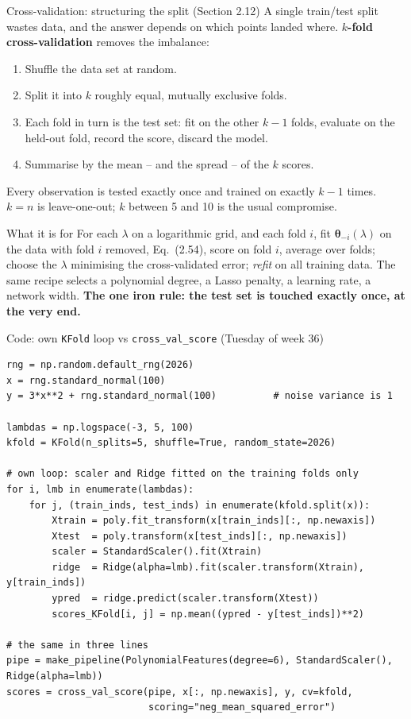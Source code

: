 \documentclass[10pt,aspectratio=169]{beamer}
\begin{document}
\begin{frame}{Cross-validation: structuring the split (Section 2.12)}
A single train/test split wastes data, and the answer depends on which points
landed where.  \textbf{$k$-fold cross-validation} removes the imbalance:
\begin{enumerate}
  \item Shuffle the data set at random.
  \item Split it into $k$ roughly equal, mutually exclusive folds.
  \item Each fold in turn is the test set: fit on the other $k-1$ folds,
        evaluate on the held-out fold, record the score, discard the model.
  \item Summarise by the mean -- and the spread -- of the $k$ scores.
\end{enumerate}
Every observation is tested exactly once and trained on exactly $k-1$ times.
$k=n$ is leave-one-out; $k$ between 5 and 10 is the usual compromise.
\vspace{4pt}
\begin{block}{What it is for}
For each $\lambda$ on a logarithmic grid, and each fold $i$, fit
$\bm{\theta}_{-i}(\lambda)$ on the data with fold $i$ removed, Eq.~(2.54),
score on fold $i$, average over folds; choose the $\lambda$ minimising the
cross-validated error; \emph{refit} on all training data.  The same recipe
selects a polynomial degree, a Lasso penalty, a learning rate, a network
width.  \textbf{The one iron rule: the test set is touched exactly once, at
the very end.}
\end{block}
\end{frame}

\begin{frame}[fragile]{Code: own \texttt{KFold} loop vs \texttt{cross\_val\_score} (Tuesday of week 36)}
\begin{lstlisting}
rng = np.random.default_rng(2026)
x = rng.standard_normal(100)
y = 3*x**2 + rng.standard_normal(100)          # noise variance is 1

lambdas = np.logspace(-3, 5, 100)
kfold = KFold(n_splits=5, shuffle=True, random_state=2026)

# own loop: scaler and Ridge fitted on the training folds only
for i, lmb in enumerate(lambdas):
    for j, (train_inds, test_inds) in enumerate(kfold.split(x)):
        Xtrain = poly.fit_transform(x[train_inds][:, np.newaxis])
        Xtest  = poly.transform(x[test_inds][:, np.newaxis])
        scaler = StandardScaler().fit(Xtrain)
        ridge  = Ridge(alpha=lmb).fit(scaler.transform(Xtrain), y[train_inds])
        ypred  = ridge.predict(scaler.transform(Xtest))
        scores_KFold[i, j] = np.mean((ypred - y[test_inds])**2)

# the same in three lines
pipe = make_pipeline(PolynomialFeatures(degree=6), StandardScaler(), Ridge(alpha=lmb))
scores = cross_val_score(pipe, x[:, np.newaxis], y, cv=kfold,
                         scoring="neg_mean_squared_error")
\end{lstlisting}
\end{frame}
\end{document}
